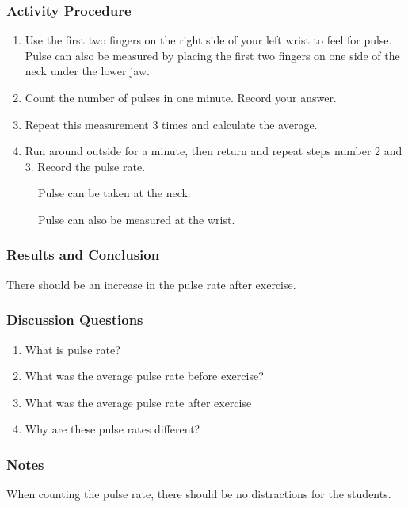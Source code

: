 \subsubsection*{Activity Procedure}
\begin{enumerate}
\item{Use the first two fingers on the right side of your left wrist to feel for pulse. Pulse can also be measured by placing the first two fingers on one side of the neck under the lower jaw.}
\item{Count the number of pulses in one minute. Record your answer.}
\item{Repeat this measurement 3 times and calculate the average.}
\item{Run around outside for a minute, then return and repeat steps number 2 and 3. Record the pulse rate.}
\end{enumerate}

\begin{figure}[h]
\begin{center}
\def\svgwidth{3cm}

\caption{Pulse can be taken at the neck.}
\label{fig:pulse-1}
\end{center}
\end{figure}

\begin{figure}[h]
\begin{center}
\def\svgwidth{4cm}

\caption{Pulse can also be measured at the wrist.}
\label{fig:pulse-2}
\end{center}
\end{figure}

\subsubsection*{Results and Conclusion}
There should be an increase in the pulse rate after exercise.

\subsubsection*{Discussion Questions}
\begin{enumerate}
\item{What is pulse rate?}
\item{What was the average pulse rate before exercise?}
\item{What was the average pulse rate after exercise}
\item{Why are these pulse rates different?}
\end{enumerate}

\subsubsection*{Notes}
When counting the pulse rate, there should be no distractions for the students. 
